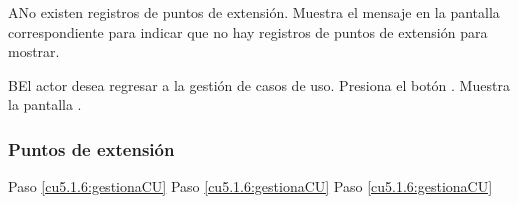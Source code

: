  \begin{UCtrayectoriaA}{A}{No existen registros de puntos de extensión.}
    \UCpaso[\UCsist] Muestra el mensaje  en la pantalla correspondiente
    para indicar que no hay registros de puntos de extensión para mostrar.
 \end{UCtrayectoriaA}
 
 \begin{UCtrayectoriaA}{B}{El actor desea regresar a la gestión de casos de uso.}
    \UCpaso[\UCactor] Presiona el botón .
    \UCpaso[\UCsist] Muestra la pantalla .
 \end{UCtrayectoriaA}

\subsubsection{Puntos de extensión}

	{Paso \ref{cu5.1.6:gestionaCU}}
	{}
	{Paso \ref{cu5.1.6:gestionaCU}}
	{}
	{Paso \ref{cu5.1.6:gestionaCU}}
	{}
  